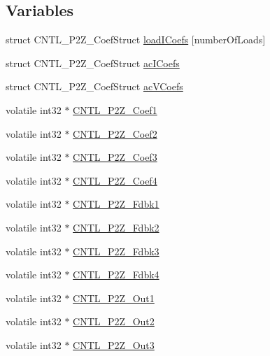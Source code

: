 \subsection*{Variables}
\begin{DoxyCompactItemize}
\item 
struct C\-N\-T\-L\-\_\-P2\-Z\-\_\-\-Coef\-Struct \hyperlink{a00014_af15987bb0b6b0819b233fa6963671a35}{load\-I\-Coefs} \mbox{[}number\-Of\-Loads\mbox{]}
\item 
struct C\-N\-T\-L\-\_\-P2\-Z\-\_\-\-Coef\-Struct \hyperlink{a00014_a05ea1ba581ea8bf1eb5c44f15534d31c}{ac\-I\-Coefs}
\item 
struct C\-N\-T\-L\-\_\-P2\-Z\-\_\-\-Coef\-Struct \hyperlink{a00014_a07dbef418ea85cb169ebfc52e9571d68}{ac\-V\-Coefs}
\item 
volatile int32 $\ast$ \hyperlink{a00014_a047c759a71b80d8cfd5e6f52b1b021b9}{C\-N\-T\-L\-\_\-P2\-Z\-\_\-\-Coef1}
\item 
volatile int32 $\ast$ \hyperlink{a00014_abdc599cbabc62898c49926678c3327e6}{C\-N\-T\-L\-\_\-P2\-Z\-\_\-\-Coef2}
\item 
volatile int32 $\ast$ \hyperlink{a00014_a1e357d296e76299ea04d7a63e4c46d1b}{C\-N\-T\-L\-\_\-P2\-Z\-\_\-\-Coef3}
\item 
volatile int32 $\ast$ \hyperlink{a00014_afe468cb1e995b267671e88b8d292aef6}{C\-N\-T\-L\-\_\-P2\-Z\-\_\-\-Coef4}
\item 
volatile int32 $\ast$ \hyperlink{a00014_a9c0418a780375035750c3d4dc16f3ae4}{C\-N\-T\-L\-\_\-P2\-Z\-\_\-\-Fdbk1}
\item 
volatile int32 $\ast$ \hyperlink{a00014_a6092ef1c1c54802bb5e11564f782390d}{C\-N\-T\-L\-\_\-P2\-Z\-\_\-\-Fdbk2}
\item 
volatile int32 $\ast$ \hyperlink{a00014_a939782d23ddbf7f45e5e393a65bafcff}{C\-N\-T\-L\-\_\-P2\-Z\-\_\-\-Fdbk3}
\item 
volatile int32 $\ast$ \hyperlink{a00014_a6937e965f3ae840ea6ee43cce410680f}{C\-N\-T\-L\-\_\-P2\-Z\-\_\-\-Fdbk4}
\item 
volatile int32 $\ast$ \hyperlink{a00014_a84d7c096ca668d1edc5e4fa54abe5d98}{C\-N\-T\-L\-\_\-P2\-Z\-\_\-\-Out1}
\item 
volatile int32 $\ast$ \hyperlink{a00014_ae6679b66ffeca93742f973a2c947855f}{C\-N\-T\-L\-\_\-P2\-Z\-\_\-\-Out2}
\item 
volatile int32 $\ast$ \hyperlink{a00014_a11dcb9f6b6d03fe960ddf790e1ad5ed2}{C\-N\-T\-L\-\_\-P2\-Z\-\_\-\-Out3}
\item 

\end{DoxyCompactItemize}
